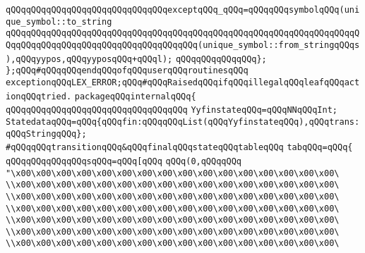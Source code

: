\verb|qQQqqQQqqQQqqQQqqQQqqQQqqQQqqQQqexceptqQQq_qQQq=qQQqqQQqsymbolqQQq(unique_symbol::to_string|\newline
\verb|qQQqqQQqqQQqqQQqqQQqqQQqqQQqqQQqqQQqqQQqqQQqqQQqqQQqqQQqqQQqqQQqqQQqqQQqqQQqqQQqqQQqqQQqqQQqqQQqqQQqqQQqqQQq(unique_symbol::from_stringqQQqs),qQQqyypos,qQQqyyposqQQq+qQQql);|\newline
\verb|qQQqqQQqqQQqqQQq};|\newline
\newline
\verb|};qQQq#qQQqqQQqendqQQqofqQQquserqQQqroutinesqQQq|\newline
\verb|exceptionqQQqLEX_ERROR;qQQq#qQQqRaisedqQQqifqQQqillegalqQQqleafqQQqactionqQQqtried.|\newline
\verb|packageqQQqinternalqQQq{|\newline
\verb|qQQqqQQqqQQqqQQqqQQqqQQqqQQqqQQqqQQq|\newline
\newline
\verb|YyfinstateqQQq=qQQqNNqQQqInt;|\newline
\verb|StatedataqQQq=qQQq{qQQqfin:qQQqqQQqList(qQQqYyfinstateqQQq),qQQqtrans:qQQqStringqQQq};|\newline
\verb|#qQQqqQQqtransitionqQQq&qQQqfinalqQQqstateqQQqtableqQQq|\newline
\verb|tabqQQq=qQQq{|\newline
\verb|qQQqqQQqqQQqqQQqsqQQq=qQQq[qQQq|\newline
\verb|qQQq(0,qQQqqQQq|\newline
\verb|"\x00\x00\x00\x00\x00\x00\x00\x00\x00\x00\x00\x00\x00\x00\x00\x00\|\newline
\verb|\\x00\x00\x00\x00\x00\x00\x00\x00\x00\x00\x00\x00\x00\x00\x00\x00\|\newline
\verb|\\x00\x00\x00\x00\x00\x00\x00\x00\x00\x00\x00\x00\x00\x00\x00\x00\|\newline
\verb|\\x00\x00\x00\x00\x00\x00\x00\x00\x00\x00\x00\x00\x00\x00\x00\x00\|\newline
\verb|\\x00\x00\x00\x00\x00\x00\x00\x00\x00\x00\x00\x00\x00\x00\x00\x00\|\newline
\verb|\\x00\x00\x00\x00\x00\x00\x00\x00\x00\x00\x00\x00\x00\x00\x00\x00\|\newline
\verb|\\x00\x00\x00\x00\x00\x00\x00\x00\x00\x00\x00\x00\x00\x00\x00\x00\|\newline
